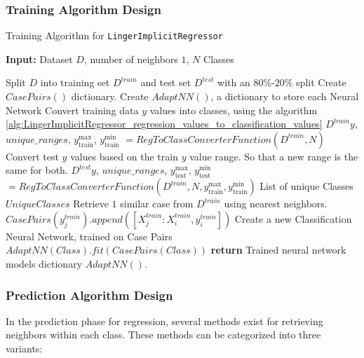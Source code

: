 \documentclass[a4paper, 12pt]{report}
\begin{document}
\subsubsection{Training Algorithm Design}
\begin{algorithm}[H]
    \caption{Training Algorithm for \texttt{LingerImplicitRegressor}}
    \label{alg:LingerImplicitRegressor_train}
    \textbf{Input:} Dataset $D$, number of neighbors $1$, $N$ Classes 
    \begin{algorithmic}
        \State Split $D$ into training set $D^{train}$ and test set $D^{test}$ with an $80\%$-$20\%$ split
        \State Create $CasePairs()$ dictionary.
        \State Create $AdaptNN()$, a dictionary to store each Neural Network
        \State Convert training data $y$ values into classes, using the algorithm \ref{alg:LingerImplicitRegressor_regression_values_to_classification_values}
        \State $D^{train}y$, $unique\_ranges$, $y_{\text{train}}^\text{max}$, $y_{\text{train}}^\text{min}$ $= Reg To Class Converter Function(D^{train}, N)$
        \State Convert test $y$ values based on the train $y$ value range. So that a new range is the same for both.
        \State $D^{test}y$, $unique\_ranges$, $y_{\text{test}}^\text{max}$, $y_{\text{test}}^\text{min}$ $= Reg To Class Converter Function(D^{train}, N, y_{\text{train}}^\text{max}, y_{\text{train}}^\text{min})$
        \State List of unique Classes $UniqueClasses$
            \State Retrieve $1$ similar case from $D^{train}$ using nearest neighbors.
                \State $CasePairs(y^{train}_j).append([X^{train}_j:X^{train}_i, y^{train}_i])$
            \EndFor
        \EndFor
            \State Create a new Classification Neural Network, trained on Case Pairs
            \State $AdaptNN(Class).fit(CasePairs(Class))$
        \EndFor
        \State \textbf{return} Trained neural network models dictionary $AdaptNN()$.
    \end{algorithmic}
\end{algorithm}

\subsubsection{Prediction Algorithm Design}
\label{sec:lingerImplicit_regression_baseV1V2_model}

In the prediction phase for regression, several methods exist for retrieving neighbors within each class. These methods can be categorized into three variants:
\end{document}
